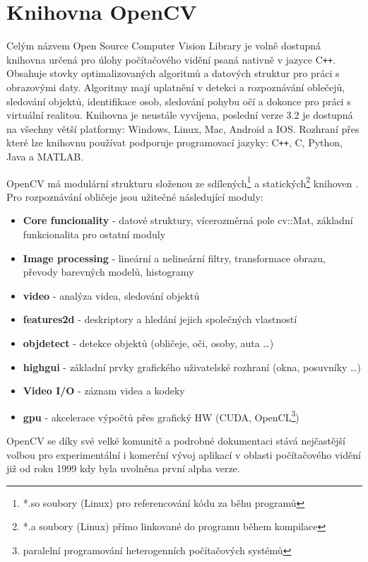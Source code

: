 \documentclass[czech,BP]{thesiskiv}
\begin{document}
\section{Knihovna OpenCV}
Celým názvem Open Source Computer Vision Library je volně dostupná knihovna určená pro úlohy počítačového vidění psaná nativně v jazyce C\texttt{++}. Obsahuje stovky optimalizovaných algoritmů a datových struktur pro práci s obrazovými daty. Algoritmy mají uplatnění v detekci a rozpoznávání oblečejů, sledování objektů, identifikace osob, sledování pohybu očí a dokonce pro práci s virtuální realitou. Knihovna je neustále vyvíjena, poslední verze $3.2$ je dostupná na všechny větší platformy: Windows, Linux, Mac, Android a IOS. Rozhraní přes které lze knihovnu používat podporuje programovací jazyky: C\texttt{++}, C, Python, Java a MATLAB. \cite{OpenCV2016online}

OpenCV má modulární strukturu složenou ze sdílených\footnote{ *.so soubory (Linux) pro referencování kódu za běhu programů} a statických\footnote{ *.a soubory (Linux) přímo linkované do programu během kompilace} knihoven \cite{OpenCVmanual2016}. Pro rozpoznávání obličeje jsou užitečné následující moduly: 

\begin{itemize}
\item \textbf{Core funcionality} - datové struktury, vícerozměrná pole cv::Mat, základní funkcionalita pro ostatní moduly 
\item \textbf{Image processing} - lineární a nelineární filtry, transformace obrazu, převody barevných modelů, histogramy
\item \textbf{video} - analýza videa, sledování objektů
\item \textbf{features2d} - deskriptory a hledání jejich společných vlastností
\item \textbf{objdetect} - detekce objektů (obličeje, oči, osoby, auta \ldots)
\item \textbf{highgui} - základní prvky grafického uživatelské rozhraní (okna, posuvníky \ldots)
\item \textbf{Video I/O} - záznam videa a kodeky
\item \textbf{gpu} - akcelerace výpočtů přes grafický HW (CUDA, OpenCL\footnote{paralelní programování heterogenních počítačových systémů})
\end{itemize}

OpenCV se díky své velké komunitě a podrobné dokumentaci stává nejčastější volbou pro experimentální i komerční vývoj aplikací v oblasti počítačového vidění již od roku 1999 kdy byla uvolněna první alpha verze.

\clearpage

 
% 
%

{\raggedright\small

}
\end{document}
